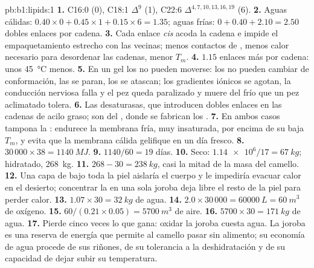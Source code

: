 \begin{solution}{pb:b1:lipids:1}
\textbf{1.} C16:0 (0), C18:1 $\Delta^9$ (1), C22:6 $\Delta^{4,7,10,13,16,19}$
(6).
\textbf{2.} Aguas cálidas: $0.40\times 0 + 0.45\times 1 + 0.15\times 6 = 1.35$;
aguas frías: $0 + 0.40 + 2.10 = 2.50$ dobles enlaces por cadena.
\textbf{3.} Cada enlace \emph{cis} acoda la cadena e impide el
empaquetamiento estrecho con las vecinas; menos contactos de ,
menos calor necesario para desordenar las cadenas, menor $T_m$.
\textbf{4.} $1.15$ enlaces más por cadena: unos \qty{45}{\celsius} menos.
\textbf{5.} En un gel los  no pueden moverse: los  no
pueden cambiar de conformación, las  se paran, los  se
atascan; los gradientes iónicos se agotan, la conducción nerviosa falla y el
pez queda paralizado y muere del frío que un pez aclimatado tolera.
\textbf{6.} Las desaturasas, que introducen dobles enlaces en las cadenas de
acilo graso; son  del , donde se
fabrican los .
\textbf{7.} En ambos casos tampona la : endurece la membrana fría,
muy insaturada, por encima de su baja $T_m$, y evita que la membrana cálida
gelifique en un día fresco.
\textbf{8.} $30\,000\times 38 = \qty{1140}{MJ}$.
\textbf{9.} $1140/60 = 19$ días.
\textbf{10.} Seco: $\num{1.14e6}/17 = \qty{67}{kg}$; hidratado,
\qty{268}{kg}.
\textbf{11.} $268 - 30 = \qty{238}{kg}$, casi la mitad de la masa del
camello.
\textbf{12.} Una capa de  bajo toda la piel aislaría el cuerpo y le
impediría evacuar calor en el desierto; concentrar la  en una sola
joroba deja libre el resto de la piel para perder calor.
\textbf{13.} $1.07\times 30 = \qty{32}{kg}$ de agua.
\textbf{14.} $2.0\times 30\,000 = \qty{60000}{L} = \qty{60}{m^3}$ de
oxígeno.
\textbf{15.} $60/(0.21\times 0.05) = \qty{5700}{m^3}$ de aire.
\textbf{16.} $5700\times 30 = \qty{171}{kg}$ de agua.
\textbf{17.} Pierde cinco veces lo que gana: oxidar la joroba cuesta agua.
La joroba es una reserva de energía que permite al camello pasar sin
alimento; su economía de agua procede de sus riñones, de su tolerancia a la
deshidratación y de su capacidad de dejar subir su temperatura.

\end{solution}

